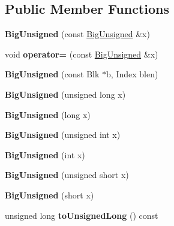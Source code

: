 \subsection*{Public Member Functions}
\begin{DoxyCompactItemize}
\item 
\mbox{\label{class_big_unsigned_ad1abf44404eab4d3be27e72506f7c420}} 
{\bfseries Big\+Unsigned} (const \mbox{\hyperlink{class_big_unsigned}{Big\+Unsigned}} \&x)
\item 
\mbox{\label{class_big_unsigned_ad15dcde2b172d86167647e5c8daefe7b}} 
void {\bfseries operator=} (const \mbox{\hyperlink{class_big_unsigned}{Big\+Unsigned}} \&x)
\item 
\mbox{\label{class_big_unsigned_a709c563de8fbdb15994519ebd6f10334}} 
{\bfseries Big\+Unsigned} (const Blk $\ast$b, Index blen)
\item 
\mbox{\label{class_big_unsigned_ad18075d22270c4716a7af69d354fbb94}} 
{\bfseries Big\+Unsigned} (unsigned long x)
\item 
\mbox{\label{class_big_unsigned_a1958814e683fbdd621f01901b8611588}} 
{\bfseries Big\+Unsigned} (long x)
\item 
\mbox{\label{class_big_unsigned_ae1f552c2be7e5b1af02e0cb246a05ce9}} 
{\bfseries Big\+Unsigned} (unsigned int x)
\item 
\mbox{\label{class_big_unsigned_ad160f7a87b715be82e4825b8b54af698}} 
{\bfseries Big\+Unsigned} (int x)
\item 
\mbox{\label{class_big_unsigned_a8300f1671b68a7bfacf81f0ea95655ab}} 
{\bfseries Big\+Unsigned} (unsigned short x)
\item 
\mbox{\label{class_big_unsigned_afd673d233f2b472feb66f5751658fb9b}} 
{\bfseries Big\+Unsigned} (short x)
\item 
\mbox{\label{class_big_unsigned_a040434d251c78c28c04e8e6f9e5469d9}} 
unsigned long {\bfseries to\+Unsigned\+Long} () const

\end{DoxyCompactItemize}
